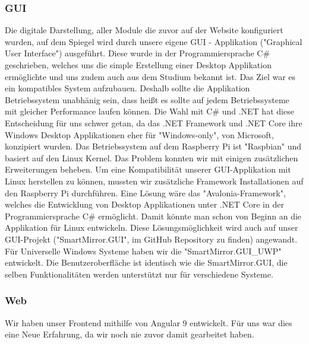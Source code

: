 \subsubsection{GUI}
Die digitale Darstellung, aller Module die zuvor auf der Website konfiguriert wurden, auf dem Spiegel wird durch unsere eigene GUI - Applikation ("Graphical User Interface") ausgeführt. Diese wurde in der Programmiersprache C\# geschrieben, welches uns die simple Erstellung einer Desktop Applikation ermöglichte und uns zudem auch aus dem Studium bekannt ist. 
Das Ziel war es ein kompatibles System aufzubauen. Deshalb sollte die Applikation Betriebssystem unabhänig sein, dass heißt es sollte auf jedem Betriebssysteme mit gleicher Performance laufen können. Die Wahl mit C\# und .NET hat diese Entscheidung für uns schwer getan, da das .NET Framework und .NET Core ihre Windows Desktop Applikationen eher für "Windows-only", von Microsoft, konzipiert wurden. Das Betriebssystem auf dem Raspberry Pi ist "Raspbian" und basiert auf den Linux Kernel. Das Problem konnten wir mit einigen zusätzlichen Erweiterungen beheben. Um eine Kompatibilität unserer GUI-Applikation mit Linux herstellen zu können, mussten wir zusätzliche Framework Installationen auf den Raspberry Pi durchführen. 
Eine Lösung wäre das "Avalonia-Framework", welches die Entwicklung von Desktop Applikationen unter .NET Core in der Programmiersprache C\# ermöglicht. Damit könnte man schon von Beginn an die Applikation für Linux entwickeln. Diese Lösungsmöglichkeit wird auch auf unser GUI-Projekt ("SmartMirror.GUI", im GitHub Repository zu finden) angewandt. 
Für Universelle Windows Systeme haben wir die "SmartMirror.GUI\_UWP" entwickelt. Die Benutzeroberfläche ist identisch wie die SmartMirror.GUI, die selben Funktionalitäten werden unterstützt nur für verschiedene Systeme.

\subsubsection{Web}
Wir haben unser Frontend mithilfe von Angular 9 entwickelt. Für uns war dies eine Neue Erfahrung, da wir noch nie zuvor damit gearbeitet haben.